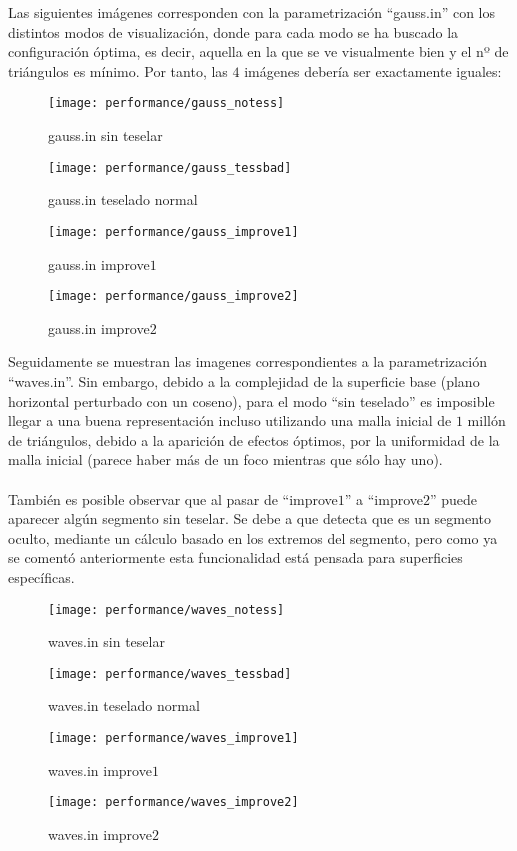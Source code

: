 	
	\newpage
	Las siguientes imágenes corresponden con la parametrización ``gauss.in'' con los distintos modos de visualización, donde para cada modo se ha buscado la configuración óptima, es decir, aquella en la que se ve visualmente bien y el nº de triángulos es mínimo. Por tanto, las $4$ imágenes debería ser exactamente iguales:
	\begin{figure}[h]
		\begin{minipage}{0.48\textwidth}
  			\centering
  			\texttt{[image: performance/gauss\_notess]}
  			\caption{gauss.in sin teselar}
		\end{minipage}\hfill
		\begin{minipage}{0.48\textwidth}
  			\centering
  			\texttt{[image: performance/gauss\_tessbad]}
  			\caption{gauss.in teselado normal}
		\end{minipage}\hfill
		
		\begin{minipage}{0.48\textwidth}
  			\centering
  			\texttt{[image: performance/gauss\_improve1]}
  			\caption{gauss.in improve$1$}
		\end{minipage}\hfill
		\begin{minipage}{0.48\textwidth}
  			\centering
  			\texttt{[image: performance/gauss\_improve2]}
  			\caption{gauss.in improve$2$}
		\end{minipage}\hfill
  		\label{fig:imagenes_gauss}
	\end{figure}	
	
	\newpage
	Seguidamente se muestran las imagenes correspondientes a la parametrización ``waves.in''. Sin embargo, debido a la complejidad de la superficie base (plano horizontal perturbado con un coseno), para el modo ``sin teselado'' es imposible llegar a una buena representación incluso utilizando una malla inicial de $1$ millón de triángulos, debido a la aparición de efectos óptimos, por la uniformidad de la malla inicial (parece haber más de un foco mientras que sólo hay uno).\\
	\\También es posible observar que al pasar de ``improve$1$'' a ``improve$2$'' puede aparecer algún segmento sin teselar. Se debe a que detecta que es un segmento oculto, mediante un cálculo basado en los extremos del segmento, pero como ya se comentó anteriormente esta funcionalidad está pensada para superficies específicas.
	\begin{figure}[h]
  		\centering
  		\texttt{[image: performance/waves\_notess]}
  		\caption{waves.in sin teselar}
  		\vspace{0.5cm}
  		\texttt{[image: performance/waves\_tessbad]}
  		\caption{waves.in teselado normal}
  		\label{fig:imagenes_waves}
	\end{figure}	
	\newpage
	\begin{figure}[h]
  		\texttt{[image: performance/waves\_improve1]}
  		\caption{waves.in improve$1$}
  		\vspace{0.5cm}
  		\texttt{[image: performance/waves\_improve2]}
  		\caption{waves.in improve$2$}
  		\label{fig:imagenes_waves2}
	\end{figure}	
		
		
\endinput
